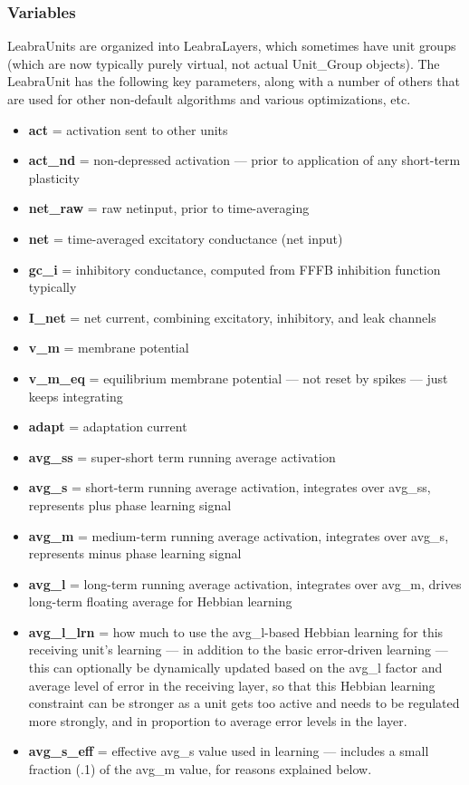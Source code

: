 \subsubsection{Variables}\label{variables}

LeabraUnits are organized into LeabraLayers, which sometimes have unit
groups (which are now typically purely virtual, not actual Unit\_Group
objects). The LeabraUnit has the following key parameters, along with a
number of others that are used for other non-default algorithms and
various optimizations, etc.

\begin{itemize}
\tightlist
\item
  \textbf{act} = activation sent to other units
\item
  \textbf{act\_nd} = non-depressed activation --- prior to application
  of any short-term plasticity
\item
  \textbf{net\_raw} = raw netinput, prior to time-averaging
\item
  \textbf{net} = time-averaged excitatory conductance (net input)
\item
  \textbf{gc\_i} = inhibitory conductance, computed from FFFB inhibition
  function typically
\item
  \textbf{I\_net} = net current, combining excitatory, inhibitory, and
  leak channels
\item
  \textbf{v\_m} = membrane potential
\item
  \textbf{v\_m\_eq} = equilibrium membrane potential --- not reset by
  spikes --- just keeps integrating
\item
  \textbf{adapt} = adaptation current
\item
  \textbf{avg\_ss} = super-short term running average activation
\item
  \textbf{avg\_s} = short-term running average activation, integrates
  over avg\_ss, represents plus phase learning signal
\item
  \textbf{avg\_m} = medium-term running average activation, integrates
  over avg\_s, represents minus phase learning signal
\item
  \textbf{avg\_l} = long-term running average activation, integrates
  over avg\_m, drives long-term floating average for Hebbian learning
\item
  \textbf{avg\_l\_lrn} = how much to use the avg\_l-based Hebbian
  learning for this receiving unit's learning --- in addition to the
  basic error-driven learning --- this can optionally be dynamically
  updated based on the avg\_l factor and average level of error in the
  receiving layer, so that this Hebbian learning constraint can be
  stronger as a unit gets too active and needs to be regulated more
  strongly, and in proportion to average error levels in the layer.
\item
  \textbf{avg\_s\_eff} = effective avg\_s value used in learning ---
  includes a small fraction (.1) of the avg\_m value, for reasons
  explained below.
\end{itemize}

